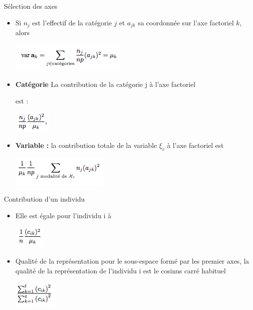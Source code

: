 \documentclass[12pt]{beamer}
\begin{document}
\begin{frame}{ Sélection des axes }
 
 \begin{itemize}
 \item   Si $n_j$ est l’effectif de la catégorie $j$ et $a_{jk}$ sa coordonnée sur l’axe factoriel $k$, alors

\centering  
  
 \includegraphics[scale=0.7]{AFC9} 
 
 
 \item  \textbf{Catégorie} La contribution de la catégorie j à l’axe factoriel

est : 

\centering 

 \includegraphics[scale=0.7]{AFC10} 
 
 \item  \textbf{Variable :} la contribution totale de la variable $\xi_v$ à l'axe factoriel est 
 
  \includegraphics[scale=0.7]{AFC11} 
  
   
 \end{itemize}
 
 
\end{frame}




\begin{frame}{ Contribution d’un individu }
 
 \begin{itemize}
 
 \centering  
 \item   Elle est égale pour l'individu i à 
 
 \includegraphics[scale=.8]{AFC12} 


\item Qualité de la représentation pour le sous-espace formé
par les  premier axes, la qualité de la représentation de
l'individu i est le cosinus carré habituel
   
    \includegraphics[scale=.8]{AFC13} 
 \end{itemize}
 
 
\end{frame}
\end{document}
